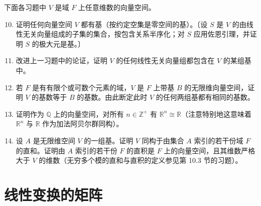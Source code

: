 \noindent 下面各习题中 \(V\) 是域 \(F\) 上任意维数的向量空间。

\begin{enumerate}
\setcounter{enumi}{9}
\item 证明任何向量空间 \(V\) 都有基（按约定空集是零空间的基）。〔设 \(S\) 是 \(V\) 的由线性无关向量组成的子集的集合，按包含关系半序化；对 \(S\) 应用佐恩引理，并证明 \(S\) 的极大元是基。〕

\item 改进上一习题中的论证，证明 \(V\) 的任何线性无关向量组都包含在 \(V\) 的某组基中。

\item 若 \(F\) 是有有限个或可数个元素的域，\(V\) 是 \(F\) 上带基 \(B\) 的无限维向量空间，证明 \(V\) 的基数等于 \(B\) 的基数。由此断定此时 \(V\) 的任何两组基都有相同的基数。

\item 证明作为 \(\mathbb{Q}\) 上的向量空间，对所有 \(n \in \mathbb{Z}^+\) 有 \(\mathbb{R}^n \cong \mathbb{R}\)（注意特别地这意味着 \(\mathbb{R}^n\) 与 \(\mathbb{R}\) 作为加法阿贝尔群同构）。

\item 设 \(A\) 是无限维空间 \(V\) 的一组基。证明 \(V\) 同构于由集合 \(A\) 索引的若干份域 \(F\) 的直和。证明由 \(A\) 索引的若干份 \(F\) 的直积是 \(F\) 上的向量空间，且其维数严格大于 \(V\) 的维数（无穷多个模的直和与直积的定义参见第 10.3 节的习题）。
\end{enumerate}

\section{线性变换的矩阵}

